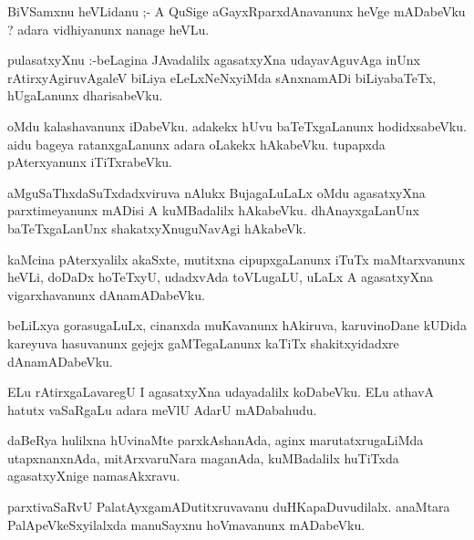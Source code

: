 \documentclass{article}
\begin{document}
\begin{mn}
BiVSamxnu  heVLidanu ;- A  QuSige  aGayxRparxdAnavanunx  heVge  mADabeVku ?  adara  vidhiyanunx  nanage  heVLu.
\end{mn}

\begin{mn}
pulasatxyXnu :-beLagina  JAvadalilx  agasatxyXna  udayavAguvAga  inUnx  rAtirxyAgiruvAgaleV  biLiya  eLeLxNeNxyiMda  
sAnxnamADi  biLiyabaTeTx,  hUgaLanunx  dharisabeVku.
\end{mn}

\begin{mn}
oMdu  kalashavanunx  iDabeVku.  adakekx  hUvu  baTeTxgaLanunx  hodidxsabeVku.  aidu  bageya  
ratanxgaLanunx  adara  oLakekx   hAkabeVku. tupapxda  pAterxyanunx  iTiTxrabeVku.
\end{mn}

\begin{mn}
aMguSaThxdaSuTxdadxviruva  nAlukx  BujagaLuLaLx  oMdu  agasatxyXna  parxtimeyanunx  mADisi  A  
kuMBadalilx  hAkabeVku.  dhAnayxgaLanUnx  baTeTxgaLanUnx  shakatxyXnuguNavAgi  hAkabeVk.  
\end{mn}

\begin{mn}
kaMcina  pAterxyalilx  akaSxte,  mutitxna  cipupxgaLanunx  iTuTx  maMtarxvanunx  heVLi,  
doDaDx hoTeTxyU,  udadxvAda  toVLugaLU,  uLaLx  A  agasatxyXna  vigarxhavanunx  dAnamADabeVku.
\end{mn}

\begin{mn}
beLiLxya  gorasugaLuLx,  cinanxda  muKavanunx  hAkiruva,  karuvinoDane  kUDida  kareyuva  
hasuvanunx  gejejx  gaMTegaLanunx  kaTiTx  shakitxyidadxre  dAnamADabeVku.
\end{mn}

\begin{mn}
ELu  rAtirxgaLavaregU  I  agasatxyXna  udayadalilx  koDabeVku.  ELu  athavA  hatutx  
vaSaRgaLu  adara  meVlU  AdarU  mADabahudu.
\end{mn}

\begin{mn}
daBeRya  hulilxna  hUvinaMte  parxkAshanAda,  aginx  marutatxrugaLiMda  utapxnanxnAda,  
mitArxvaruNara  maganAda,  kuMBadalilx  huTiTxda  agasatxyXnige  namasAkxravu.
\end{mn}

\begin{mn}
parxtivaSaRvU  PalatAyxgamADutitxruvavanu  duHKapaDuvudilalx.  anaMtara  PalApeVkeSxyilalxda  
manuSayxnu  hoVmavanunx  mADabeVku.
\end{mn}
\end{document}
